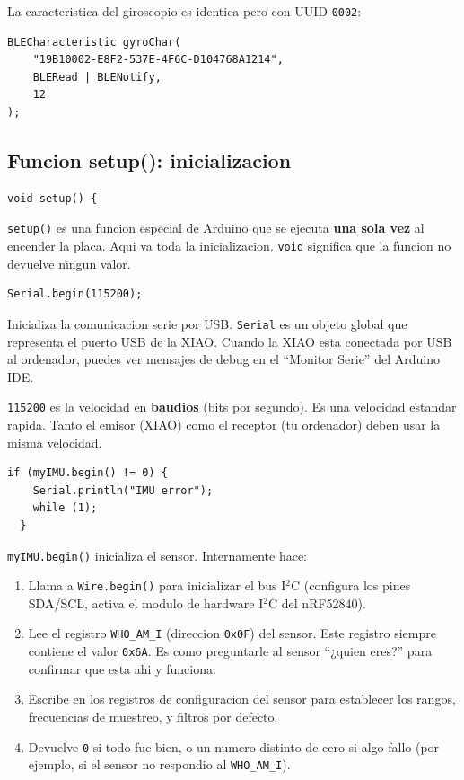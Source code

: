 \documentclass[11pt,a4paper]{article}
\begin{document}
La caracteristica del giroscopio es identica pero con UUID
\texttt{0002}:

\begin{lstlisting}[style=arduino]
BLECharacteristic gyroChar(
    "19B10002-E8F2-537E-4F6C-D104768A1214",
    BLERead | BLENotify,
    12
);
\end{lstlisting}

\subsection{Funcion setup(): inicializacion}

\begin{lstlisting}[style=arduino]
void setup() {
\end{lstlisting}

\texttt{setup()} es una funcion especial de Arduino que se ejecuta
\textbf{una sola vez} al encender la placa. Aqui va toda la
inicializacion. \texttt{void} significa que la funcion no devuelve
ningun valor.

\begin{lstlisting}[style=arduino]
  Serial.begin(115200);
\end{lstlisting}

Inicializa la comunicacion serie por USB. \texttt{Serial} es un
objeto global que representa el puerto USB de la XIAO. Cuando la
XIAO esta conectada por USB al ordenador, puedes ver mensajes de
debug en el ``Monitor Serie'' del Arduino IDE.

\texttt{115200} es la velocidad en \textbf{baudios} (bits por
segundo). Es una velocidad estandar rapida. Tanto el emisor (XIAO)
como el receptor (tu ordenador) deben usar la misma velocidad.

\begin{lstlisting}[style=arduino]
  if (myIMU.begin() != 0) {
    Serial.println("IMU error");
    while (1);
  }
\end{lstlisting}

\texttt{myIMU.begin()} inicializa el sensor. Internamente hace:

\begin{enumerate}
    \item Llama a \texttt{Wire.begin()} para inicializar el bus
          I$^2$C (configura los pines SDA/SCL, activa el modulo
          de hardware I$^2$C del nRF52840).

    \item Lee el registro \texttt{WHO\_AM\_I} (direccion
          \texttt{0x0F}) del sensor. Este registro siempre contiene
          el valor \texttt{0x6A}. Es como preguntarle al sensor
          ``¿quien eres?'' para confirmar que esta ahi y funciona.

    \item Escribe en los registros de configuracion del sensor
          para establecer los rangos, frecuencias de muestreo, y
          filtros por defecto.

    \item Devuelve \texttt{0} si todo fue bien, o un numero distinto
          de cero si algo fallo (por ejemplo, si el sensor no
          respondio al \texttt{WHO\_AM\_I}).
\end{enumerate}
\end{document}
